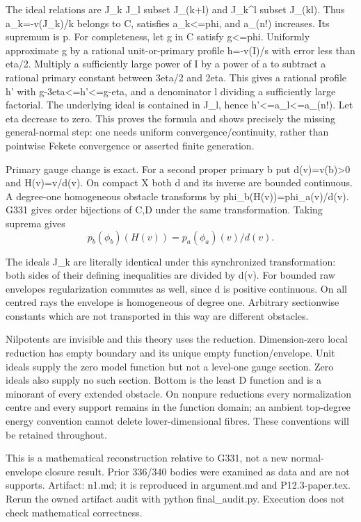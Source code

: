\documentclass[11pt]{article}
\begin{document}
The ideal relations are J\_k J\_l subset J\_(k+l) and J\_k\textasciicircum{}l subset J\_(kl). Thus a\_k=-v(J\_k)/k belongs to C, satisfies a\_k<=phi, and a\_(n!) increases. Its supremum is p. For completeness, let g in C satisfy g<=phi. Uniformly approximate g by a rational unit-or-primary profile h=-v(I)/s with error less than eta/2. Multiply a sufficiently large power of I by a power of a to subtract a rational primary constant between 3eta/2 and 2eta. This gives a rational profile h' with g-3eta<=h'<=g-eta, and a denominator l dividing a sufficiently large factorial. The underlying ideal is contained in J\_l, hence h'<=a\_l<=a\_(n!). Let eta decrease to zero. This proves the formula and shows precisely the missing general-normal step: one needs uniform convergence/continuity, rather than pointwise Fekete convergence or asserted finite generation.

Primary gauge change is exact. For a second proper primary b put d(v)=v(b)>0 and H(v)=v/d(v). On compact X both d and its inverse are bounded continuous. A degree-one homogeneous obstacle transforms by phi\_b(H(v))=phi\_a(v)/d(v). G331 gives order bijections of C,D under the same transformation. Taking suprema gives
\[
p_b(\phi_b)(H(v))=p_a(\phi_a)(v)/d(v).
\]

The ideals J\_k are literally identical under this synchronized transformation: both sides of their defining inequalities are divided by d(v). For bounded raw envelopes regularization commutes as well, since d is positive continuous. On all centred rays the envelope is homogeneous of degree one. Arbitrary sectionwise constants which are not transported in this way are different obstacles.

Nilpotents are invisible and this theory uses the reduction. Dimension-zero local reduction has empty boundary and its unique empty function/envelope. Unit ideals supply the zero model function but not a level-one gauge section. Zero ideals also supply no such section. Bottom is the least D function and is a minorant of every extended obstacle. On nonpure reductions every normalization centre and every support remains in the function domain; an ambient top-degree energy convention cannot delete lower-dimensional fibres. These conventions will be retained throughout.

This is a mathematical reconstruction relative to G331, not a new normal-envelope closure result. Prior 336/340 bodies were examined as data and are not supports. Artifact: n1.md; it is reproduced in argument.md and P12.3-paper.tex. Rerun the owned artifact audit with python final\_audit.py. Execution does not check mathematical correctness.
\end{document}
